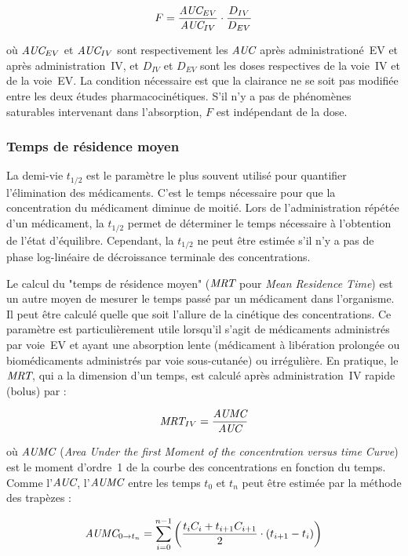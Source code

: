 \begin{equation}
F = \frac{\operatorname{\textit{AUC}}_{EV}}{\operatorname{\textit{AUC}}_{IV}} \cdot \frac{D_{IV}}{D_{EV}}
\label{eq:5}
\end{equation}

où $\operatorname{\textit{AUC}}_{EV}$ et $\operatorname{\textit{AUC}}_{IV}$ sont respectivement les $\operatorname{\textit{AUC}}$ après administrationé~EV et après administration~IV, et $D_{IV}$ et $D_{EV}$ sont les doses respectives de la voie~IV et de la voie~EV. La condition nécessaire est que la clairance ne se soit pas modifiée entre les deux études pharmacocinétiques. S'il n'y a pas de phénomènes saturables intervenant dans l'absorption, $F$ est indépendant de la dose.

\subsubsection{Temps de résidence moyen} 
La demi-vie $t_{1/2}$ est le paramètre le plus souvent utilisé pour quantifier l'élimination des médicaments. C'est le temps nécessaire pour que la concentration du médicament diminue de moitié. Lors de l'administration répétée d'un médicament, la $t_{1/2}$ permet de déterminer le temps nécessaire à l'obtention de l'état d'équilibre. Cependant, la $t_{1/2}$ ne peut être estimée s'il n'y a pas de phase log-linéaire de décroissance terminale des concentrations.

Le calcul du "temps de résidence moyen" ($\operatorname{\textit{MRT}}$ pour \textit{Mean Residence Time}) est un autre moyen de mesurer le temps passé par un médicament dans l'organisme. Il peut être calculé quelle que soit l'allure de la cinétique des concentrations. Ce paramètre est particulièrement utile lorsqu'il s'agit de médicaments administrés par voie~EV et ayant une absorption lente (médicament à libération prolongée ou biomédicaments administrés par voie sous-cutanée) ou irrégulière. En pratique, le $\operatorname{\textit{MRT}}$, qui a la dimension d'un temps, est calculé après administration~IV rapide (bolus) par :

\begin{equation}
\operatorname{\textit{MRT}}_{IV} = \frac{\operatorname{\textit{AUMC}}}{\operatorname{\textit{AUC}}}
\label{eq:6}
\end{equation}

où $\operatorname{\textit{AUMC}}$ (\textit{Area Under the first Moment of the concentration versus time Curve}) est le moment d'ordre~1 de la courbe des concentrations en fonction du temps. Comme l'$\operatorname{\textit{AUC}}$, l'$\operatorname{\textit{AUMC}}$ entre les temps $t_0$ et $t_n$ peut être estimée par la méthode des trapèzes :

\begin{equation}
\operatorname{\textit{AUMC}}_{0 \to t_n} = \sum_{i=0}^{n-1}\left ( \frac{t_i C_i + t_{i+1}C_{i+1}}{2}\cdot \left ( t_{i+1}-t_i \right ) \right )
\label{eq:7}
\end{equation}

